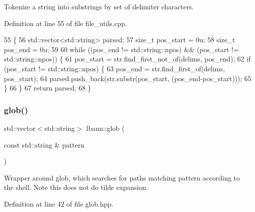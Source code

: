 Tokenize a string into substrings by set of delimiter characters. 



Definition at line 55 of file file\+\_\+utils.\+cpp.


\begin{DoxyCode}
55                                                                              \{
56   std::vector<std::string> parsed;
57   \textcolor{keywordtype}{size\_t} pos\_start = 0u;
58   \textcolor{keywordtype}{size\_t} pos\_end = 0u;
59 
60   \textcolor{keywordflow}{while} ((pos\_end != std::string::npos) && (pos\_start != std::string::npos)) \{
61     pos\_start = str.find\_first\_not\_of(delims, pos\_end);
62     \textcolor{keywordflow}{if} (pos\_start != std::string::npos) \{
63       pos\_end = str.find\_first\_of(delims, pos\_start);
64       parsed.push\_back(str.substr(pos\_start, (pos\_end-pos\_start)));
65     \}
66   \}
67   \textcolor{keywordflow}{return} parsed;
68 \}
\end{DoxyCode}
\mbox{\label{namespacelbann_a840c9f1d5f27bc30d081fb90529889e6}} 
\subsubsection{\texorpdfstring{glob()}{glob()}}
{\footnotesize\ttfamily std\+::vector$<$std\+::string$>$ lbann\+::glob (\begin{DoxyParamCaption}\item[{const std\+::string \&}]{pattern }\end{DoxyParamCaption})\hspace{0.3cm}{\ttfamily [inline]}}

Wrapper around glob, which searches for paths matching pattern according to the shell. Note this does not do tilde expansion. 

Definition at line 42 of file glob.\+hpp.


